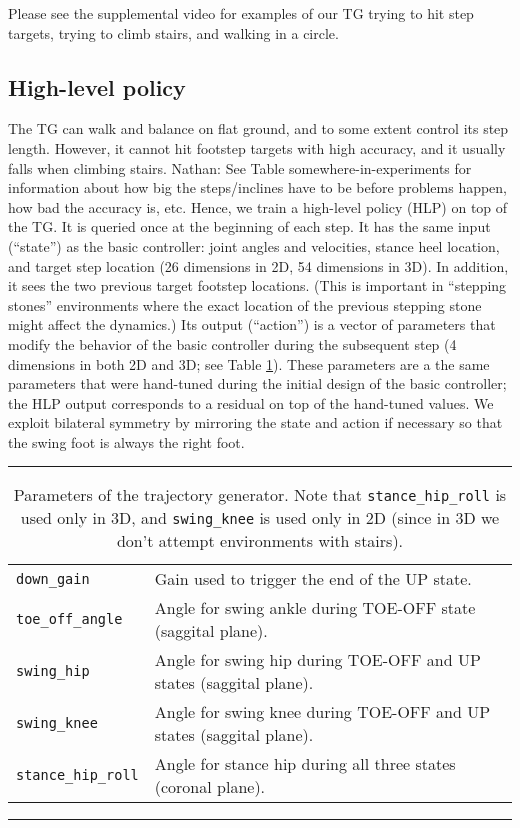 \documentclass[a4paper]{article}
\newcommand{\nhatch}[1]{{\leavevmode\color{blue} Nathan: #1}}
\begin{document}
Please see the supplemental video for examples of our TG trying to hit step targets, trying to climb stairs, and walking in a circle.


\subsection{High-level policy}

The TG can walk and balance on flat ground, and to some extent control its step length.
However, it cannot hit footstep targets with high accuracy, and it usually falls when climbing stairs.
\nhatch{See Table somewhere-in-experiments for information about how big the steps/inclines have to be before problems happen, how bad the accuracy is, etc.}
Hence, we train a high-level policy (HLP) on top of the TG.
It is queried once at the beginning of each step.
It has the same input (``state'') as the basic controller: joint angles and velocities, stance heel location, and target step location (26 dimensions in 2D, 54 dimensions in 3D).
In addition, it sees the two previous target footstep locations.
(This is important in ``stepping stones'' environments where the exact location of the previous stepping stone might affect the dynamics.)
Its output (``action'') is a vector of parameters that modify the behavior of the basic controller during the subsequent step (4 dimensions in both 2D and 3D; see Table \ref{table:params}).
These parameters are a the same parameters that were hand-tuned during the initial design of the basic controller; the HLP output corresponds to a residual on top of the hand-tuned values.
We exploit bilateral symmetry by mirroring the state and action if necessary so that the swing foot is always the right foot.

\begin{table}
  \caption{Parameters of the trajectory generator.
  Note that \texttt{stance\_hip\_roll} is used only in 3D, and \texttt{swing\_knee} is used only in 2D (since in 3D we don't attempt environments with stairs).}
  \label{table:params}
  \hrule
  \begin{tabular}{ll}
    \texttt{down\_gain} & Gain used to trigger the end of the UP state. \\
    \texttt{toe\_off\_angle} & Angle for swing ankle during TOE-OFF state (saggital plane). \\
    \texttt{swing\_hip} & Angle for swing hip during TOE-OFF and UP states (saggital plane). \\
    \texttt{swing\_knee} & Angle for swing knee during TOE-OFF and UP states (saggital plane). \\
    \texttt{stance\_hip\_roll} & Angle for stance hip during all three states (coronal plane). \\
  \end{tabular}
  \hrule
\end{table}
\end{document}
